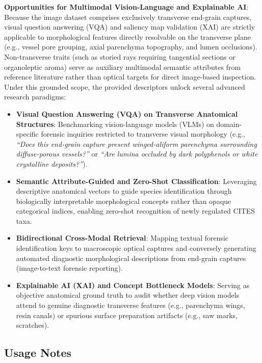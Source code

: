 \documentclass[a4paper,fleqn,12pt]{cas-sc}
\begin{document}
\noindent
\textbf{Opportunities for Multimodal Vision-Language and Explainable AI}:
Because the image dataset comprises exclusively transverse end-grain captures, visual question answering (VQA) and saliency map validation (XAI) are strictly applicable to morphological features directly resolvable on the transverse plane (e.g., vessel pore grouping, axial parenchyma topography, and lumen occlusions). Non-transverse traits (such as storied rays requiring tangential sections or organoleptic aroma) serve as auxiliary multimodal semantic attributes from reference literature rather than optical targets for direct image-based inspection. Under this grounded scope, the provided descriptors unlock several advanced research paradigms:
\begin{itemize}[leftmargin=*,itemsep=2pt,topsep=2pt]
    \item \textbf{Visual Question Answering (VQA) on Transverse Anatomical Structures}: Benchmarking vision-language models (VLMs) on domain-specific forensic inquiries restricted to transverse visual morphology (e.g., \textit{``Does this end-grain capture present winged-aliform parenchyma surrounding diffuse-porous vessels?''} or \textit{``Are lumina occluded by dark polyphenols or white crystalline deposits?''}).
    \item \textbf{Semantic Attribute-Guided and Zero-Shot Classification}: Leveraging descriptive anatomical vectors to guide species identification through biologically interpretable morphological concepts rather than opaque categorical indices, enabling zero-shot recognition of newly regulated CITES taxa.
    \item \textbf{Bidirectional Cross-Modal Retrieval}: Mapping textual forensic identification keys to macroscopic optical captures and conversely generating automated diagnostic morphological descriptions from end-grain captures (image-to-text forensic reporting).
    \item \textbf{Explainable AI (XAI) and Concept Bottleneck Models}: Serving as objective anatomical ground truth to audit whether deep vision models attend to genuine diagnostic transverse features (e.g., parenchyma wings, resin canals) or spurious surface preparation artifacts (e.g., saw marks, scratches).
\end{itemize}

\subsection{Usage Notes}
\label{sec:usage_notes}
\end{document}
